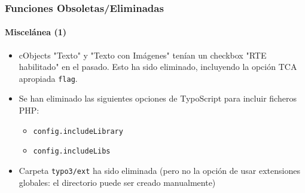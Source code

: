 \begin{frame}[fragile]
	\frametitle{Funciones Obsoletas/Eliminadas}
	\framesubtitle{Miscelánea (1)}

	\begin{itemize}

		\item cObjects "Texto" y "Texto con Imágenes" tenían un checkbox "RTE habilitado" en el pasado.
			Esto ha sido eliminado, incluyendo la opción TCA apropiada \texttt{flag}.

		\item Se han eliminado las siguientes opciones de TypoScript para incluir ficheros PHP:

			\begin{itemize}
				\item \texttt{config.includeLibrary}
				\item \texttt{config.includeLibs}
			\end{itemize}

		\item Carpeta \texttt{typo3/ext} ha sido eliminada\newline
			\small
				(pero no la opción de usar extensiones globales: el directorio puede ser creado manualmente)
			\normalsize

	\end{itemize}

\end{frame}


